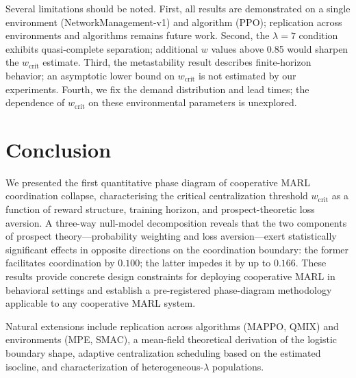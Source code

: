\documentclass[11pt]{article}
\newcommand{\wcrit}{w_{\mathrm{crit}}}
\begin{document}
Several limitations should be noted.
First, all results are demonstrated on a single environment
(NetworkManagement-v1) and algorithm (PPO); replication across environments
and algorithms remains future work.
Second, the $\lambda{=}7$ condition exhibits quasi-complete separation;
additional $w$ values above 0.85 would sharpen the $\wcrit$ estimate.
Third, the metastability result describes finite-horizon behavior; an
asymptotic lower bound on $\wcrit$ is not estimated by our experiments.
Fourth, we fix the demand distribution and lead times; the dependence of
$\wcrit$ on these environmental parameters is unexplored.

\section{Conclusion}
\label{sec:conclusion}

We presented the first quantitative phase diagram of cooperative MARL
coordination collapse, characterising the critical centralization threshold
$\wcrit$ as a function of reward structure, training horizon, and
prospect-theoretic loss aversion.
A three-way null-model decomposition reveals that the two components of
prospect theory---probability weighting and loss aversion---exert
statistically significant effects in opposite directions on the
coordination boundary: the former facilitates coordination by $0.100$;
the latter impedes it by up to $0.166$.
These results provide concrete design constraints for deploying cooperative
MARL in behavioral settings and establish a pre-registered phase-diagram
methodology applicable to any cooperative MARL system.

Natural extensions include replication across algorithms (MAPPO, QMIX)
and environments (MPE, SMAC), a mean-field theoretical derivation of the
logistic boundary shape, adaptive centralization scheduling based on the
estimated isocline, and characterization of heterogeneous-$\lambda$
populations.


\end{document}
